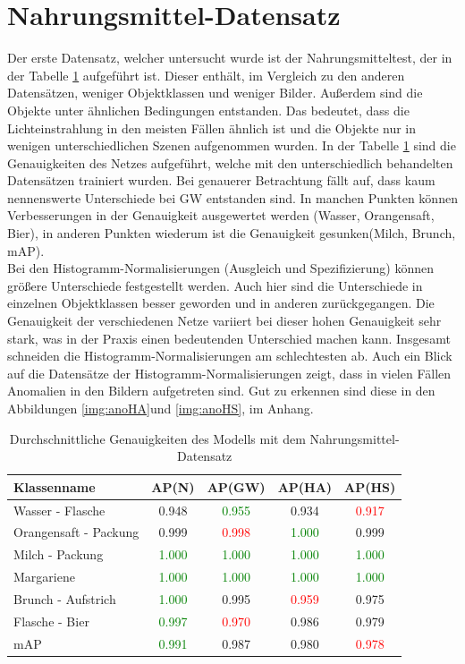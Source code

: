   \section{Nahrungsmittel-Datensatz}
Der erste Datensatz, welcher untersucht wurde ist der Nahrungsmitteltest, der in der Tabelle \ref{tab:nahrungsmitteltest} aufgeführt ist. Dieser enthält, im Vergleich zu den anderen Datensätzen, weniger Objektklassen und weniger Bilder. Außerdem sind die Objekte unter ähnlichen Bedingungen entstanden. Das bedeutet, dass die Lichteinstrahlung in den meisten Fällen ähnlich ist und die Objekte nur in wenigen unterschiedlichen Szenen aufgenommen wurden. In der Tabelle \ref{tab:nahrungsmitteltest} sind die Genauigkeiten des Netzes aufgeführt, welche mit den unterschiedlich behandelten Datensätzen trainiert wurden. Bei genauerer Betrachtung fällt auf, dass kaum nennenswerte Unterschiede bei GW entstanden sind. In manchen Punkten können Verbesserungen in der Genauigkeit ausgewertet werden (Wasser, Orangensaft, Bier), in anderen Punkten wiederum ist die Genauigkeit gesunken(Milch, Brunch, mAP).\\
Bei den Histogramm-Normalisierungen (Ausgleich und Spezifizierung) können größere Unterschiede festgestellt werden. Auch hier sind die Unterschiede in einzelnen Objektklassen besser geworden und in anderen zurückgegangen. Die Genauigkeit der verschiedenen Netze variiert bei dieser hohen Genauigkeit sehr stark, was in der Praxis einen bedeutenden Unterschied machen kann. Insgesamt schneiden die Histogramm-Normalisierungen am schlechtesten ab. Auch ein Blick auf die Datensätze der Histogramm-Normalisierungen zeigt, dass in vielen Fällen Anomalien in den Bildern aufgetreten sind. Gut zu erkennen sind diese in den Abbildungen \ref{img:anoHA}und \ref{img:anoHS}, im Anhang.
\begin{table}
[h]
\caption{Durchschnittliche Genauigkeiten des Modells mit dem Nahrungsmittel-Datensatz}
\centering
\begin{tabular}{|l|c|c|c|c|}
\hline
Klassenname & AP(N) & AP(GW) & AP(HA) & AP(HS)\\
\hline
Wasser - Flasche & 0.948 & \textcolor{green}{0.955} & 0.934 & \textcolor{red}{0.917}\\
Orangensaft - Packung & 0.999 & \textcolor{red}{0.998} & \textcolor{green}{1.000} & 0.999\\
Milch - Packung & \textcolor{green}{1.000} & \textcolor{green}{1.000} & \textcolor{green}{1.000} & \textcolor{green}{1.000}\\
Margariene & \textcolor{green}{1.000} & \textcolor{green}{1.000} & \textcolor{green}{1.000} & \textcolor{green}{1.000}\\
Brunch - Aufstrich & \textcolor{green}{1.000} & 0.995 & \textcolor{red}{0.959} & 0.975\\
Flasche - Bier & \textcolor{green}{0.997} & \textcolor{red}{0.970} & 0.986 & 0.979\\
\hline
mAP & \textcolor{green}{0.991} & 0.987 & 0.980 & \textcolor{red}{0.978}\\
\hline
\end{tabular}
\label{tab:nahrungsmitteltest}
\end{table}
